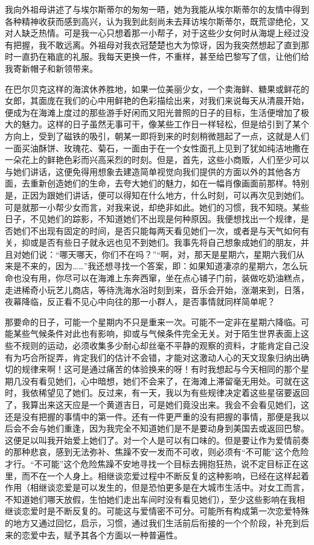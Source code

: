 \par 我向外祖母讲述了与埃尔斯蒂尔的匆匆一晤，她为我能从埃尔斯蒂尔的友情中得到各种精神收获而感到高兴，认为我到此刻尚未去拜访埃尔斯蒂尔，既荒谬绝伦，又对人缺乏热情。可是我一心只想着那一小帮子，对于这些少女何时从海堤上经过没有把握，我不敢远离。外祖母对我衣冠楚楚也大为惊讶，因为我突然想起了直到那时一直扔在箱底的礼服。我每天更换一件，不重样，甚至给巴黎写了信，让他们给我寄新帽子和新领带来。
\par 在巴尔贝克这样的海滨休养胜地，如果一位美丽少女，一个卖海鲜、糖果或鲜花的女郎，其面庞在我们的心中用鲜艳的色彩描绘出来，对我们来说每天从清晨开始，便成为在海滩上度过的那些游手好闲而又阳光普照的日子的目标，生活便增加了极大的魅力。这样的日子虽然无事可干，像某些工作日一样轻松，但是给引到了某个方向上，受到了磁铁的吸引，朝某一即将到来的时刻稍微翘起了一点，这就是人们一面买油酥饼、玫瑰花、菊石，一面由于在一个女性面孔上见到了犹如纯洁地撒在一朵花上的鲜艳色彩而兴高采烈的时刻。但是，首先，这些小商贩，人们至少可以与她们讲话，这便免得用想象去建造简单视觉向我们提供的方面以外的其他各方面，去重新创造她们的生命，去夸大她们的魅力，如在一幅肖像画面前那样。特别是，正因为跟她们讲话，便可以得知在什么地方，什么时刻，可以再次见到她们。可是就那一小帮少女而言，对我来说，却绝非如此。她们的习惯，我不知晓。某些日子，不见她们的踪影，不知道她们不出现是何种原因。我便想找出一个规律，是否她们不出现有固定的时间，是否只能每两天看见她们一次，或者是与天气如何有关，抑或是否有些日子就永远也见不到她们。我事先将自己想象成她们的朋友，并且对她们说：“哪天哪天，你们不在吗？”“啊，对，那天是星期六，星期六我们从来是不来的，因为……”我还想寻找一个答案，即：如果知道凄凉的星期六，怎么玩命也没有用，你尽可以在海滩上东奔西窜，坐在点心铺子门前，装做吃奶油糕点，走进稀奇小玩艺儿商店，等待洗海水浴时刻到来，音乐会开始，涨潮来到，日落，夜幕降临，反正看不见心中向往的那一小群人，是否事情就同样简单呢？
\par 那要命的日子，可能一个星期内不只是重来一次。可能不一定非在星期六降临。可能某些气候条件对此也有影响，抑或与气候条件完全无关。对于陌生世界表面上这些不规则的运动，必须收集多少耐心却丝毫不平静的观察的资料，才能肯定自己没有为巧合所捉弄，肯定我们的估计不会错，才能对这激动人心的天文现象归纳出确切的规律来啊！这可是通过痛苦的体验换来的呀！有时我想起与今天相同的那个星期几没有看见她们，心中暗想，她们不会来了，在海滩上滞留毫无用处。可就在这时，我依稀望见了她们。反过来，有一天，我以为有些规律决定着这些星宿要返回了，我算出来这天应是一个黄道吉日，可是她们竟没出来。我会不会看见她们，这还是没有把握的事情中的第一件。还有一件更严重的没有把握的事情，那便是我以后会不会与她们重逢，因为我完全不知道她们是不是要动身到美国去或返回巴黎。这便足以叫我开始爱上她们了。对一个人是可以有口味的。但是要让作为爱情前奏的那种悲哀，感到无法弥补、焦躁不安一发而不可收，则必须有“不可能”这个危险才行。“不可能”这个危险焦躁不安地寻找一个目标去拥抱狂热，说不定目标正在这里，而不在一个人身上。相继谈恋爱过程中不断反复的这种影响，已经在这样起着作用（相继谈恋爱是可以发生的，但是恐怕更多是在大城市生活中。对女工而言，不知道她们哪天放假，生怕她们走出车间时没有看见她们），至少这些影响在我相继谈恋爱时是不断反复的。可能这与爱情密不可分。可能所有构成第一次恋爱特殊的地方又通过回忆，启示，习惯，通过我们生活前后衔接的一个个阶段，补充到后来的恋爱中去，赋予其各个方面以一种普遍性。
